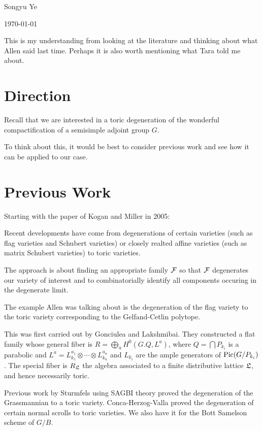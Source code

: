 \documentclass[12pt]{article}
\begin{document}
Songyu Ye

\today

\hfill

This is my understanding from looking at the literature and thinking about what 
Allen said last time. Perhaps it is also worth mentioning what Tara told me about.

\hfill

\section{Direction}
Recall that we are interested in a toric degeneration of the wonderful compactification of a 
semisimple adjoint group $G$.

\hfill

To think about this, it would be best to consider previous work and see how it can be applied to our case.
\section{Previous Work}
Starting with the paper of Kogan and Miller in 2005:

Recent developments have come from degenerations of certain varieties (such as flag varieties and Schubert varieties)
or closely realted affine varieties (such as matrix Schubert varieties) to toric varieties.

\hfill

The approach is about finding an appropriate family $\mathcal{F}$ so that $\mathcal{F}$
degenerates our variety of interest and to combinatorially identify all components occuring in the degenerate limit.

\hfill

The example Allen was talking about is the degeneration of the flag variety to the toric variety corresponding
to the Gelfand-Cetlin polytope.

\hfill

This was first carried out by Gonciulea and Lakshmibai. They constructed a flat family whose general fiber is 
$R = \bigoplus_a H^0(G.Q, L^a)$, where $Q = \bigcap P_{k_i}$ is a parabolic and $L^a = L_{k_1}^{a_1} \otimes \cdots \otimes L_{k_n}^{a_n}$
and $L_{k_i}$ are the ample generators of $\operatorname{Pic}(G/P_{k_i})$. The special fiber is $R_{\mathfrak{L}}$ the algebra associated 
to a finite distributive lattice $\mathfrak{L}$, and hence necessarily toric.

\hfill

Previous work by Sturmfels using SAGBI theory proved the degeneration of the 
Grassmannian to a toric variety. Conca-Herzog-Valla proved the degeneration of 
certain normal scrolls to toric varieties. We also have it for the Bott Samelson scheme of $G/B$.
\end{document}
